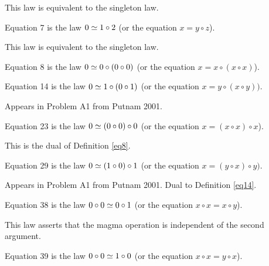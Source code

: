 This law is equivalent to the singleton law.

\begin{definition}[Equation 7]\label{eq7}\leanok{}  Equation 7 is the law $0 \simeq 1 \circ 2$ (or the equation $x = y \circ z$).
\end{definition}

This law is equivalent to the singleton law.

\begin{definition}[Equation 8]\label{eq8}\leanok{}  Equation 8 is the law $0 \simeq 0 \circ (0 \circ 0)$ (or the equation $x = x \circ (x \circ x)$).
\end{definition}

\begin{definition}[Equation 14]\label{eq14}\leanok{}  Equation 14 is the law $0 \simeq  1 \circ (0 \circ 1)$ (or the equation $x = y ∘ (x ∘ y))$.
\end{definition}

Appears in Problem A1 from Putnam 2001.


\begin{definition}[Equation 23]\label{eq23}\leanok{}  Equation 23 is the law $0 \simeq  (0 \circ 0) \circ 0$ (or the equation $x = (x \circ x) \circ x$).
\end{definition}

This is the dual of Definition \ref{eq8}.

\begin{definition}[Equation 29]\label{eq29}\leanok{}  Equation 29 is the law $0 \simeq  (1 \circ 0) \circ 1$ (or the equation $x = (y ∘ x) ∘ y)$.
\end{definition}

Appears in Problem A1 from Putnam 2001.  Dual to Definition \ref{eq14}.

\begin{definition}[Equation 38]\label{eq38}\leanok{}  Equation 38 is the law $0 \circ 0  \simeq  0 \circ 1$ (or the equation $x \circ x = x \circ y$).
\end{definition}

This law asserts that the magma operation is independent of the second argument.

\begin{definition}[Equation 39]\label{eq39}\leanok{}  Equation 39 is the law $0 \circ 0  \simeq  1 \circ 0$ (or the equation $x \circ x = y \circ x$).
\end{definition}

